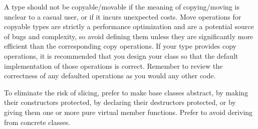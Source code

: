 A type should not be copyable/movable if the meaning of copying/moving is unclear to a casual user, or if it incurs unexpected costs. Move operations for copyable types are strictly a performance optimization and are a potential source of bugs and complexity, so avoid defining them unless they are significantly more efficient than the corresponding copy operations. If your type provides copy operations, it is recommended that you design your class so that the default implementation of those operations is correct. Remember to review the correctness of any defaulted operations as you would any other code.

To eliminate the risk of slicing, prefer to make base classes abstract, by making their constructors protected, by declaring their destructors protected, or by giving them one or more pure virtual member functions. Prefer to avoid deriving from concrete classes.

